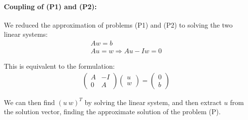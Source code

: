 \documentclass{article}
\begin{document}

\paragraph{Coupling of (P1) and (P2):}

\noindent We reduced the approximation of problems (P1) and (P2) to solving the two linear systems:
\begin{gather*}
    Aw=b\\
    Au=w \Rightarrow Au-Iw=0
\end{gather*}

\noindent This is equivalent to the formulation:
\begin{gather*}
    \begin{pmatrix}
        A &-I\\
        0 & A
    \end{pmatrix}
    \begin{pmatrix}
        u \\ w
    \end{pmatrix}
    = \begin{pmatrix}
        0 \\ b
    \end{pmatrix}
\end{gather*}

\noindent We can then find $(u \: w)^T$ by solving the linear system, and then extract $u$ from the solution vector, finding the approximate solution of the problem (P).
\end{document}
